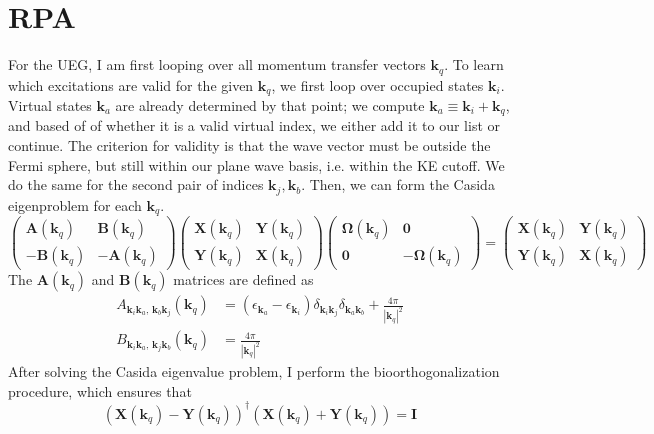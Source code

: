 \section{RPA}
For the UEG, I am first looping over all momentum transfer vectors $\bm{k}_q$. To learn which excitations are valid for the given $\bm{k}_q$, we first loop over occupied states $\bm{k}_i$. Virtual states $\bm{k}_a$ are already determined by that point; we compute $\bm{k}_a \equiv \bm{k}_i + \bm{k}_q$, and based of of whether it is a valid virtual index, we either add it to our list or continue. The criterion for validity is that the wave vector must be outside the Fermi sphere, but still within our plane wave basis, i.e. within the KE cutoff. We do the same for the second pair of indices $\bm{k}_j, \bm{k}_b$. Then, we can form the Casida eigenproblem for each $\bm{k}_q$.
\begin{equation}
    \begin{pmatrix}
        \bm{A}(\bm{k}_q) & \bm{B}(\bm{k}_q) \\
        -\bm{B}(\bm{k}_q) & -\bm{A}(\bm{k}_q)
    \end{pmatrix}
    \begin{pmatrix}
        \bm{X}(\bm{k}_q) & \bm{Y}(\bm{k}_q) \\
        \bm{Y}(\bm{k}_q) & \bm{X}(\bm{k}_q)
    \end{pmatrix}
    \begin{pmatrix}
        \bm{\Omega}(\bm{k}_q) & \bm{0} \\
        \bm{0} & -\bm{\Omega}(\bm{k}_q)
    \end{pmatrix}
    = \begin{pmatrix}
        \bm{X}(\bm{k}_q) & \bm{Y}(\bm{k}_q) \\
        \bm{Y}(\bm{k}_q) & \bm{X}(\bm{k}_q)
    \end{pmatrix}
    \label{eqn:casida_eq}
\end{equation}
The $\bm{A}(\bm{k}_q)$ and $\bm{B}(\bm{k}_q)$ matrices are defined as
\begin{align}
    A_{\bm{k}_i \bm{k}_a,\, \bm{k}_b \bm{k}_j }(\bm{k}_q) &= \left(\epsilon_{\bm{k}_a}-\epsilon_{\bm{k}_i}\right) \delta_{\bm{k}_i \bm{k}_j} \delta_{\bm{k}_a \bm{k}_b} + \frac{4\pi}{|\bm{k}_q|^2} \\
    B_{\bm{k}_i \bm{k}_a,\, \bm{k}_j \bm{k}_b}(\bm{k}_q) &= \frac{4\pi}{|\bm{k}_q|^2}
\end{align}
After solving the Casida eigenvalue problem, I perform the bioorthogonalization procedure, which ensures that
\begin{equation}
    \left(\bm{X}(\bm{k}_q) - \bm{Y}(\bm{k}_q)\right)^\dagger \left(\bm{X}(\bm{k}_q) + \bm{Y}(\bm{k}_q)\right) = \bm{I}
\end{equation}

